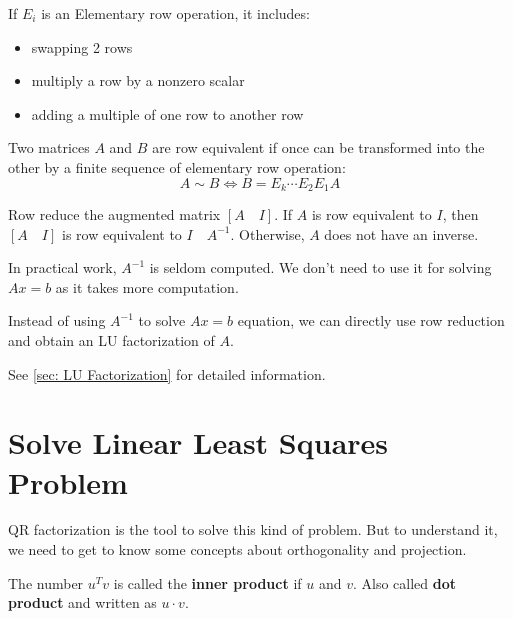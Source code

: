 \begin{note}
    If \(E_i\) is an Elementary row operation, it includes:
        \begin{itemize}
            \item swapping 2 rows
            \item multiply a row by a nonzero scalar
            \item adding a multiple of one row to another row
        \end{itemize}

    \begin{definition}
       Two matrices \(A\) and \(B\) are row equivalent if once can be transformed into the other by a finite sequence of elementary row operation:
       \[
        A \sim B  \iff B = E_k \cdots E_2 E_1 A
       \] 
    \end{definition}

    \begin{theorem}[Algorithm]
        Row reduce the augmented matrix \([A \quad I]\).  
        If \(A\) is row equivalent to \(I\), then \([A \quad I]\) is row equivalent to \(I \quad A^{-1}\).    
        Otherwise, \(A\)  does not have an inverse.
    \end{theorem}

    \begin{remark}
        In practical work, \(A^{-1}\) is seldom computed. 
        We don't need to use it for solving \(Ax = b\) as it takes more computation. 
    \end{remark}
\end{note}

Instead of using \(A^{-1}\) to solve \(Ax = b\) equation, we can directly use row reduction and obtain an LU factorization of \(A\).  

See \ref{sec: LU Factorization} for detailed information.

\section{Solve Linear Least Squares Problem} \label{sec: LLSP}
QR factorization is the tool to solve this kind of problem.
But to understand it, we need to get to know some concepts about orthogonality and projection.

\begin{definition}
   The number \(u^T v\) is called the \textbf{inner product}  if \(u\) and \(v\).   
   Also called \textbf{dot product} and written as \(u \cdot v\).  
\end{definition}

